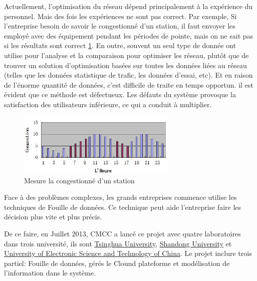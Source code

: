 Actuellement, l'optimisation du réseau dépend principalement à la expérience du personnel. Mais des fois les expériences ne sont pas correct. Par exemple, Si l'entreprise besoin de savoir le congestionné d'un station, il faut envoyer les employé avec des équipement pendant les périodes de pointe, mais on ne sait pas si les résultats sont correct \ref{meseau}.  En outre, souvent un seul type de  donnée ont utilise pour l'analyse et la comparaison pour optimiser les réseau, plutôt que de trouver un solution d'optimisation basées sur toutes les données liées au réseau (telles que les données statistique de trafic, les données d'essai, etc). Et en raison de l'énorme quantité de données, c'est difficile de traite en temps opportun. il est évident que ce méthode est défectueux. Les défauts du système provoque la satisfaction des utilisateurs inférieure, ce qui a conduit à multiplier.
      \begin{figure}[H]
          \centering
          \includegraphics[width=3in]{images/meseau.jpg}
          \caption{Mesure la congestionné d'un station}
          \label{meseau}
      \end{figure}
      
Face à des problèmes complexes, les grands entreprises commence utilise les techniques de Fouille de données. Ce technique peut aide l'entreprise faire les décision plus vite et plus précis.

De ce faire, en Juillet 2013, CMCC a lancé ce projet avec quatre laboratoires dans trois université, ils sont
 \href{http://www.tsinghua.edu.cn/publish/newthuen/index.html}{Tsinghua University}, \href{http://en.sdu.edu.cn/}{Shandong University} et \href{http://www.oice.uestc.edu.cn/en/}{University of Electronic Science and Technology of China}. Le projet inclure trois partiel: Fouille de données, gérés le Clound plateforme et modélisation de l'information dans le système.
 

